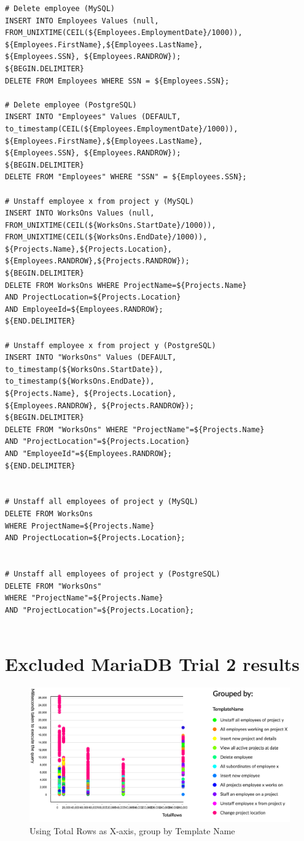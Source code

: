 \documentclass[12pt]{report}
\begin{document}
\begin{spacing}{1.9}
\begin{verbatim}
# Delete employee (MySQL)
INSERT INTO Employees Values (null,
FROM_UNIXTIME(CEIL(${Employees.EmploymentDate}/1000)),
${Employees.FirstName},${Employees.LastName}, 
${Employees.SSN}, ${Employees.RANDROW});
${BEGIN.DELIMITER}
DELETE FROM Employees WHERE SSN = ${Employees.SSN};

# Delete employee (PostgreSQL)
INSERT INTO "Employees" Values (DEFAULT,
to_timestamp(CEIL(${Employees.EmploymentDate}/1000)),
${Employees.FirstName},${Employees.LastName}, 
${Employees.SSN}, ${Employees.RANDROW});
${BEGIN.DELIMITER}
DELETE FROM "Employees" WHERE "SSN" = ${Employees.SSN};

# Unstaff employee x from project y (MySQL)
INSERT INTO WorksOns Values (null,
FROM_UNIXTIME(CEIL(${WorksOns.StartDate}/1000)),
FROM_UNIXTIME(CEIL(${WorksOns.EndDate}/1000)),
${Projects.Name},${Projects.Location},
${Employees.RANDROW},${Projects.RANDROW});
${BEGIN.DELIMITER}
DELETE FROM WorksOns WHERE ProjectName=${Projects.Name} 
AND ProjectLocation=${Projects.Location} 
AND EmployeeId=${Employees.RANDROW};
${END.DELIMITER}

# Unstaff employee x from project y (PostgreSQL)
INSERT INTO "WorksOns" Values (DEFAULT,
to_timestamp(${WorksOns.StartDate}),
to_timestamp(${WorksOns.EndDate}),
${Projects.Name}, ${Projects.Location},
${Employees.RANDROW}, ${Projects.RANDROW});
${BEGIN.DELIMITER}
DELETE FROM "WorksOns" WHERE "ProjectName"=${Projects.Name} 
AND "ProjectLocation"=${Projects.Location} 
AND "EmployeeId"=${Employees.RANDROW};
${END.DELIMITER}


# Unstaff all employees of project y (MySQL)
DELETE FROM WorksOns 
WHERE ProjectName=${Projects.Name} 
AND ProjectLocation=${Projects.Location};


# Unstaff all employees of project y (PostgreSQL)
DELETE FROM "WorksOns" 
WHERE "ProjectName"=${Projects.Name}  
AND "ProjectLocation"=${Projects.Location};
	
	\end{verbatim}
	
	\chapter{Excluded MariaDB Trial 2 results}
	\begin{figure}[H]
		\centering
		\includegraphics[width=\textwidth]{maria2-temp.png}
		\caption{Using Total Rows as X-axis, group by Template Name}
		

\end{figure}
\end{spacing}
\end{document}
